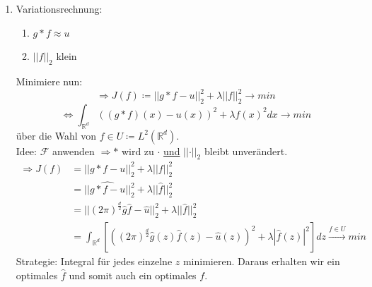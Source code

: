 \documentclass[ngerman]{article}
\theoremstyle{plain}
\theoremstyle{definition}
\numberwithin{equation}{section}
\newcommand{\norm}[1] {
\left|\left| #1 \right|\right|
}
\newcommand{\R}[0] {
\mathbb R
}
\newcommand{\F}[0]{
    \mathcal F
}
\newcommand{\C}[0]{
    \cdot
}
\begin{document}
\begin{enumerate}[label = \arabic*. Ansatz:]
\begin{minipage}[c]{0.4\textwidth}
\begin{center}
                        \end{center}
                    \end{minipage}
                    \item Variationsrechnung:
                        \begin{enumerate}[label = \arabic*. Wunsch:]
                            \item $g *f \approx u$
                            \item $\norm{f}_2$ klein
                        \end{enumerate}
                        Minimiere nun:
                        \[\Rightarrow J(f)  \coloneqq  \norm{g * f - u}_2^2 + \lambda \norm{f}_2^2 \to min\]
                        \[\iff \int_{\R^d} ((g*f)(x) - u(x))^2 + \lambda f(x)^2 dx \to min\]
                        über die Wahl von $f \in U \coloneqq  L^2(\R^d)$.\\
                        Idee: $\F$ anwenden $\Rightarrow *$ wird zu $\C$ \underline{und} $\norm{\C}_2$ bleibt unverändert.
                        \begin{align*}
                            \Rightarrow J(f)&=\norm{g*f-u}_2^2 + \lambda\norm{f}_2^2\\
                            &=||\widehat{g*f-u}||_2^2 + \lambda ||\hat f||_2^2\\
                            &=||(2 \pi)^\frac{d}{2} \hat g \hat f -\hat u||_2^2 + \lambda||\hat f||_2^2\\
                            &=\int_{\R^d}\left[ \left((2 \pi)^\frac{d}{2} \hat g(z) \hat f(z) - \hat u(z)\right)^2 + \lambda |\hat f(z)|^2 \right] dz \overset{f \in U}{\longrightarrow} min
                        \end{align*}
                    Strategie: Integral für jedes einzelne $z$ minimieren. Daraus erhalten wir ein optimales $\hat f$ und somit auch ein optimales $f$.\\

\end{enumerate}
\end{document}
